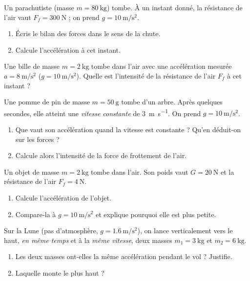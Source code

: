 \documentclass[11pt,a4paper]{article}
\begin{document}

\begin{exo}
Un parachutiste (masse $m=\qty{80}{\kilogram}$) tombe. À un instant donné, la résistance de l'air
vaut $F_f=\qty{300}{\newton}$ ; on prend $g=\qty{10}{\metre\per\second\squared}$.
\begin{enumerate}[label=\alph*)]
  \item Écris le bilan des forces dans le sens de la chute.
  \item Calcule l'accélération à cet instant.
\end{enumerate}
\end{exo}

\begin{exo}
Une bille de masse $m=\qty{2}{\kilogram}$ tombe dans l'air avec une accélération mesurée
$a=\qty{8}{\metre\per\second\squared}$ ($g=\qty{10}{\metre\per\second\squared}$).
Quelle est l'intensité de la résistance de l'air $F_f$ à cet instant ?
\end{exo}

\begin{exo}
Une pomme de pin de masse $m=\qty{50}{\gram}$ tombe d'un arbre. Après quelques secondes, elle atteint
une \emph{vitesse constante} de \qty{3}{\metre\per\second}. On prend $g=\qty{10}{\metre\per\second\squared}$.
\begin{enumerate}[label=\alph*)]
  \item Que vaut son accélération quand la vitesse est constante ? Qu'en déduit-on sur les forces ?
  \item Calcule alors l'intensité de la force de frottement de l'air.
\end{enumerate}
\end{exo}

\begin{exo}[pourquoi $a<g$ ?]
Un objet de masse $m=\qty{2}{\kilogram}$ tombe dans l'air. Son poids vaut $G=\qty{20}{\newton}$ et la
résistance de l'air $F_f=\qty{4}{\newton}$.
\begin{enumerate}[label=\alph*)]
  \item Calcule l'accélération de l'objet.
  \item Compare-la à $g=\qty{10}{\metre\per\second\squared}$ et explique pourquoi elle est plus petite.
\end{enumerate}
\end{exo}

\begin{exo}
Sur la Lune (pas d'atmosphère, $g=\qty{1,6}{\metre\per\second\squared}$), on lance verticalement vers le
haut, \emph{en même temps} et à la \emph{même vitesse}, deux masses $m_1=\qty{3}{\kilogram}$ et
$m_2=\qty{6}{\kilogram}$.
\begin{enumerate}[label=\alph*)]
  \item Les deux masses ont-elles la même accélération pendant le vol ? Justifie.
  \item Laquelle monte le plus haut ?
\end{enumerate}
\end{exo}
\end{document}
